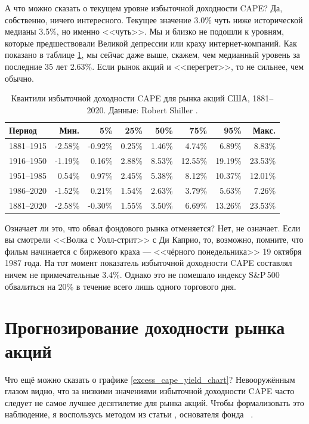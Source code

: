 А что можно сказать о текущем уровне избыточной доходности CAPE? Да, собственно, ничего интересного. Текущее значение 3.0\% чуть ниже исторической медианы 3.5\%, но именно <<чуть>>. Мы и близко не подошли к уровням, которые предшествовали Великой депрессии или краху интернет-компаний. Как показано в таблице \ref{cape_excess_yield_quantiles_table}, мы сейчас даже выше, скажем,  чем медианный уровень за последние 35 лет 2.63\%. Если рынок акций и <<перегрет>>, то не сильнее, чем обычно.

\begin{table}[ht]
\centering
\begin{tabular}{l|r|r|r|r|r|r|r}
Период       & Мин.      & 5\%       & 25\%   & 50\%    & 75\%      & 95\% & Макс. \\ \hline
1881--1915 & -2.58\% & -0.92\% & 0.25\% & 1.46\% &   4.74\% & 6.89\%  & 8.83\% \\
1916--1950 & -1.19\% &  0.16\% & 2.88\% & 8.53\% & 12.55\%  & 19.19\% & 23.53\% \\
1951--1985 &  0.54\% &  0.97\% & 2.45\% & 5.38\% &   8.12\%  & 10.37\% & 12.01\% \\
1986--2020 & -1.52\% &  0.21\% & 1.54\% & 2.63\% &   3.79\%  & 5.63\%  & 7.26\% \\ \hline
1881--2020 & -2.58\% & -0.30\% & 1.55\% & 3.50\% &   6.69\%  & 13.26\% & 23.53\%
\end{tabular}
\caption{Квантили избыточной доходности CAPE для рынка акций США, 1881--2020. Данные: Robert Shiller \cite{shillerOnline}.}
\label{cape_excess_yield_quantiles_table}
\end{table}

Означает ли это, что обвал фондового рынка отменяется? Нет, не означает. Если вы смотрели <<Волка с Уолл-стрит>> с Ди Каприо, то, возможно, помните, что фильм начинается с биржевого краха --- <<чёрного понедельника>> 19 октября 1987 года. На тот момент показатель избыточной доходности CAPE составлял ничем не примечательные 3.4\%. Однако это не помешало индексу S\&P\,500 обвалиться на 20\% в течение всего лишь одного торгового дня. 


\section*{Прогнозирование доходности рынка акций}

Что ещё можно сказать о графике \ref{excess_cape_yield_chart}? Невооружённым глазом видно, что за низкими значениями избыточной доходности CAPE часто следует не самое лучшее десятилетие для рынка акций. Чтобы формализовать это наблюдение, я воспользусь методом из статьи , основателя фонда \ \cite{asness2012old}.

